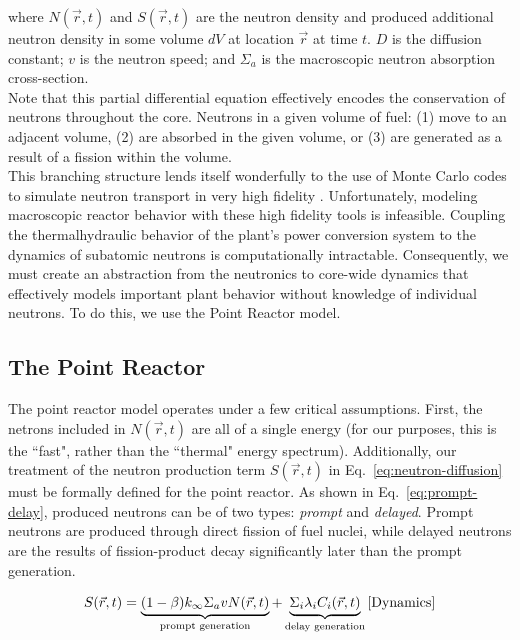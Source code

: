 \documentclass[review,onefignum,onetabnum]{siamart171218}
\begin{document}
where $N(\vec{r}, t)$ and $S(\vec{r}, t)$ are the neutron density and produced
additional neutron density in some volume $dV$ at location
$\vec{r}$ at time $t$.  $D$ is the diffusion constant; $v$ is the neutron
speed; and $\Sigma_a$ is the macroscopic neutron absorption cross-section.\cite{Dynamics} \\

Note that this partial differential equation effectively encodes the
conservation of neutrons throughout the core. Neutrons in a given volume of
fuel: (1) move to an adjacent volume, (2) are absorbed in the given
volume, or (3) are generated as a result of a fission within the volume.\\

This branching structure lends itself wonderfully to the use of
Monte Carlo codes to simulate neutron transport in very high fidelity \cite{Serpent}.
Unfortunately, modeling macroscopic reactor behavior with these high fidelity
tools is infeasible. Coupling the thermalhydraulic behavior of the plant's
power conversion system to the dynamics of subatomic neutrons is
computationally intractable. Consequently, we must create an abstraction from
the neutronics to core-wide dynamics that effectively models important plant
behavior without knowledge of individual neutrons. To do this, we use the
Point Reactor model.

\subsection{The Point Reactor}
The point reactor model operates under a few critical assumptions. First,
the netrons included in $N(\vec{r}, t)$ are all of a single
energy (for our purposes, this is the ``fast", rather than the ``thermal" energy spectrum).
Additionally, our treatment of the neutron production term $S(\vec{r}, t)$
in Eq.~\cref{eq:neutron-diffusion} must be formally defined for the point
reactor. As shown in Eq.~\cref{eq:prompt-delay}, produced neutrons can be of
two types: \emph{prompt} and \emph{delayed}. Prompt neutrons are produced
through direct fission of fuel nuclei, while delayed neutrons are the
results of fission-product decay significantly later than the prompt
generation.

\begin{equation}
  S(\vec{r}, t) = \underbrace{(1-\beta)k_{\infty}\Sigma_avN(\vec{r}, t)}_{\text{prompt generation}} + \underbrace{\Sigma_i\lambda_iC_i(\vec{r}, t)}_{\text{delay generation}}
  \label{eq:prompt-delay}\cite{Dynamics}
\end{equation}
\end{document}

